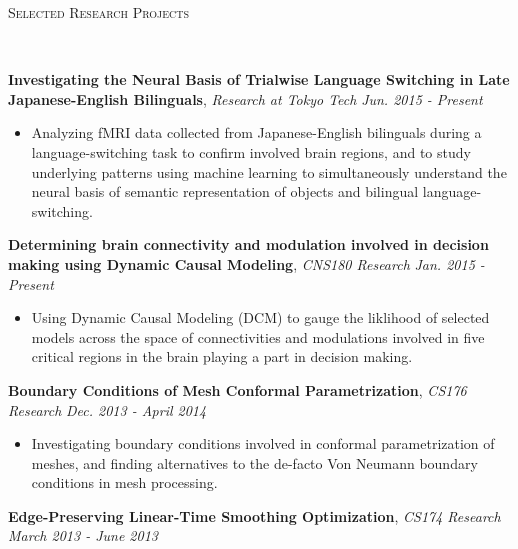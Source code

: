 \documentclass[9pt]{article}
\newenvironment{changemargin}[2]{%
  \begin{list}{}{%
    \setlength{\topsep}{0pt}%
    \setlength{\leftmargin}{#1}%
    \setlength{\rightmargin}{#2}%
    \setlength{\listparindent}{\parindent}%
    \setlength{\itemindent}{\parindent}%
    \setlength{\parsep}{\parskip}%
  }%
  \item[]}{\end{list}
}
\newcommand{\lineover}{
	\begin{changemargin}{-0.05in}{-0.05in}
		\vspace*{-8pt}
		\hrulefill \\
		\vspace*{-2pt}
	\end{changemargin}
}
\newcommand{\header}[1]{
	\begin{changemargin}{-0.5in}{-0.5in}
		\scshape{#1}\\
  	\lineover
	\end{changemargin}
}
\newenvironment{body} {
	\vspace*{-16pt}
	\begin{changemargin}{-0.25in}{-0.5in}
  }	
	{\end{changemargin}
}
\begin{document}



\header{Selected Research Projects}
\begin{body}
	\vspace{18pt}
	\textbf{Investigating the Neural Basis of Trialwise Language Switching in Late Japanese-English Bilinguals}, \emph{Research at Tokyo Tech} \hfill \emph{Jun. 2015 - Present} \\
		\vspace*{-3pt}
	\begin{itemize} \itemsep -0pt
	\item Analyzing fMRI data collected from Japanese-English bilinguals during a language-switching task to confirm involved brain regions, and to study underlying patterns using machine learning to simultaneously understand the neural basis of semantic representation of objects and bilingual language-switching.
	\end{itemize}
		\vspace{-3pt}
	\textbf{Determining brain connectivity and modulation involved in decision making using Dynamic Causal Modeling}, \emph{CNS180 Research} \hfill \emph{Jan. 2015 - Present} \\
		\vspace*{-3pt}
	\begin{itemize} \itemsep -0pt
	\item Using Dynamic Causal Modeling (DCM) to gauge the liklihood of selected models across the space of connectivities and modulations involved in five critical regions in the brain playing a part in decision making.
	\end{itemize}
		\vspace{-3pt}
	\textbf{Boundary Conditions of Mesh Conformal Parametrization}, \emph{CS176 Research} \hfill \emph{Dec. 2013 - April 2014} \\
		\vspace*{-3pt}
	\begin{itemize} \itemsep -0pt
	\item Investigating boundary conditions involved in conformal parametrization of meshes, and finding alternatives to the de-facto Von Neumann boundary conditions in mesh processing.
	\end{itemize}
		\vspace*{-3pt}
	\textbf{Edge-Preserving Linear-Time Smoothing Optimization}, \emph{CS174 Research} \hfill \emph{March 2013 - June 2013} \\

\end{body}
\end{document}

